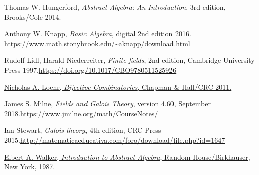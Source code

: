\documentclass[numbers=enddot,12pt,final,onecolumn,notitlepage]{scrartcl}%
\theoremstyle{definition}
\begin{document}
\begin{thebibliography}{999999999}
Thomas W. Hungerford, \textit{Abstract Algebra:
An Introduction}, 3rd edition, Brooks/Cole 2014.

Anthony W. Knapp, \textit{Basic Algebra}, digital
2nd edition 2016. \newline\url{https://www.math.stonybrook.edu/~aknapp/download.html}

Rudolf Lidl, Harald Niederreiter, \textit{Finite
fields}, 2nd edition, Cambridge University Press 1997.\newline\url{https://doi.org/10.1017/CBO9780511525926}

%
\href{https://www.math.vt.edu/people/nloehr/bijbook.html}{Nicholas A. Loehr,
\textit{Bijective Combinatorics}, Chapman \& Hall/CRC 2011.}

James S. Milne, \textit{Fields and Galois Theory},
version 4.60, September 2018.\newline\url{https://www.jmilne.org/math/CourseNotes/}

Ian Stewart, \textit{Galois theory}, 4th edition,
CRC Press 2015.\newline\url{http://matematicaeducativa.com/foro/download/file.php?id=1647}

%
\href{https://web.archive.org/web/20170809055317/https://www.math.nmsu.edu/~elbert/AbsAlgeb.pdf}{Elbert
A. Walker, \textit{Introduction to Abstract Algebra}, Random House/Birkhauser,
New York, 1987.}
\end{thebibliography}
\end{document}
